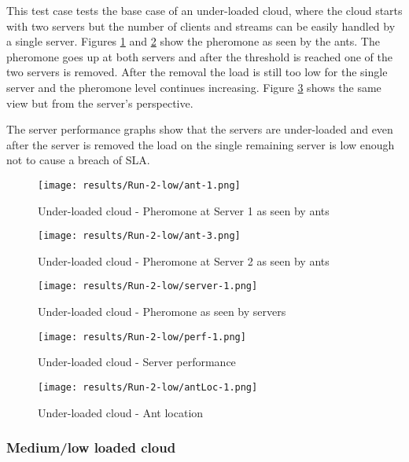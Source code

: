 This test case tests the base case of an under-loaded cloud, where the cloud starts with two servers but the number of clients and streams can be easily handled by a single server. Figures \ref{fig:2serv-ant1-low} and \ref{fig:2serv-ant3-low} show the pheromone as seen by the ants. The pheromone goes up at both servers and after the threshold is reached one of the two servers is removed. After the removal the load is still too low for the single server and the pheromone level continues increasing. Figure \ref{fig:2serv-pher-low} shows the same view but from the server's perspective.

The server performance graphs show that the servers are under-loaded and even after the server is removed the load on the single remaining server is low enough not to cause a breach of SLA.

\begin{figure}[!ht]
	\centering
		\texttt{[image: results/Run-2-low/ant-1.png]}
	\caption{Under-loaded cloud - Pheromone at Server 1 as seen by ants}
	\label{fig:2serv-ant1-low}
\end{figure}

\begin{figure}
	\centering
		\texttt{[image: results/Run-2-low/ant-3.png]}
	\caption{Under-loaded cloud - Pheromone at Server 2 as seen by ants}
	\label{fig:2serv-ant3-low}
\end{figure}

\begin{figure}
	\centering
		\texttt{[image: results/Run-2-low/server-1.png]}
	\caption{Under-loaded cloud - Pheromone as seen by servers}
	\label{fig:2serv-pher-low}
\end{figure}

\begin{figure}
	\centering
		\texttt{[image: results/Run-2-low/perf-1.png]}
	\caption{Under-loaded cloud - Server performance}
	\label{fig:2serv-perf-low}
\end{figure}

\begin{figure}
	\centering
		\texttt{[image: results/Run-2-low/antLoc-1.png]}
	\caption{Under-loaded cloud - Ant location}
	\label{fig:2serv-antloc-low}
\end{figure}

\subsubsection{Medium/low loaded cloud}

